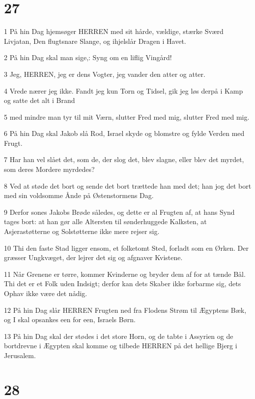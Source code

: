 \chapter{27}

\par 1 På hin Dag hjemsøger HERREN med sit hårde, vældige, stærke Sværd Livjatan, Den flugtsnare Slange, og ihjelslår Dragen i Havet.
\par 2 På hin Dag skal man sige,: Syng om en liflig Vingård!
\par 3 Jeg, HERREN, jeg er dens Vogter, jeg vander den atter og atter.
\par 4 Vrede nærer jeg ikke. Fandt jeg kun Torn og Tidsel, gik jeg løs derpå i Kamp og satte det alt i Brand
\par 5 med mindre man tyr til mit Værn, slutter Fred med mig, slutter Fred med mig.
\par 6 På hin Dag skal Jakob slå Rod, Israel skyde og blomstre og fylde Verden med Frugt.
\par 7 Har han vel slået det, som de, der slog det, blev slagne, eller blev det myrdet, som deres Mordere myrdedes?
\par 8 Ved at støde det bort og sende det bort trættede han med det; han jog det bort med sin voldsomme Ånde på Østenstormens Dag.
\par 9 Derfor sones Jakobs Brøde således, og dette er al Frugten af, at hans Synd tages bort: at han gør alle Altersten til sønderhuggede Kalksten, at Asjerastøtterne og Solstøtterne ikke mere rejser sig.
\par 10 Thi den faste Stad ligger ensom, et folketomt Sted, forladt som en Ørken. Der græsser Ungkvæget, der lejrer det sig og afgnaver Kvistene.
\par 11 Når Grenene er tørre, kommer Kvinderne og bryder dem af for at tænde Bål. Thi det er et Folk uden Indsigt; derfor kan dets Skaber ikke forbarme sig, dets Ophav ikke være det nådig.
\par 12 På hin Dag slår HERREN Frugten ned fra Flodens Strøm til Ægyptens Bæk, og I skal opsankes een for een, Israels Børn.
\par 13 På hin Dag skal der stødes i det store Horn, og de tabte i Assyrien og de bortdrevne i Ægypten skal komme og tilbede HERREN på det hellige Bjerg i Jerusalem.

\chapter{28}

